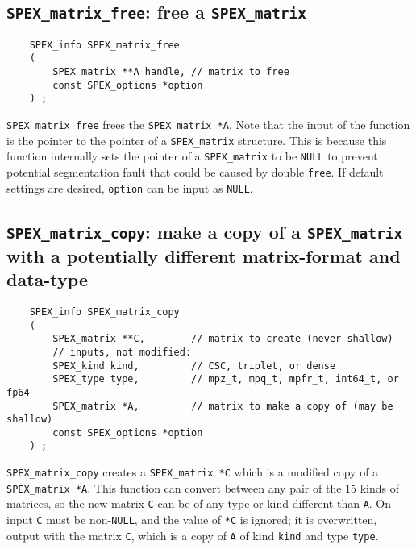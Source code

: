 \documentclass[12pt]{report}
\theoremstyle{definition}
\begin{document}
\cprotect\subsection{\verb|SPEX_matrix_free|: free a \verb|SPEX_matrix|}
\label{s:user:matrix_free}

\begin{mdframed}[userdefinedwidth=6in]
{\footnotesize
\begin{verbatim}
    SPEX_info SPEX_matrix_free
    (
        SPEX_matrix **A_handle, // matrix to free
        const SPEX_options *option
    ) ;
\end{verbatim}
} \end{mdframed}

\verb|SPEX_matrix_free| frees the \verb|SPEX_matrix *A|.  Note that the input
of the function is the pointer to the pointer of a \verb|SPEX_matrix|
structure. This is because this function internally sets the pointer of a
\verb|SPEX_matrix| to be \verb|NULL| to prevent potential segmentation fault
that could be caused by double \verb|free|.  If default settings are desired,
\verb|option| can be input as \verb|NULL|.

\cprotect\subsection{\verb|SPEX_matrix_copy|: make a copy of a \verb|SPEX_matrix| with a potentially different matrix-format and data-type}
\label{s:user:matrix_copy}

\begin{mdframed}[userdefinedwidth=6in]
{\footnotesize
\begin{verbatim}
    SPEX_info SPEX_matrix_copy
    (
        SPEX_matrix **C,        // matrix to create (never shallow)
        // inputs, not modified:
        SPEX_kind kind,         // CSC, triplet, or dense
        SPEX_type type,         // mpz_t, mpq_t, mpfr_t, int64_t, or fp64
        SPEX_matrix *A,         // matrix to make a copy of (may be shallow)
        const SPEX_options *option
    ) ;
\end{verbatim}
} \end{mdframed}

\verb|SPEX_matrix_copy| creates a \verb|SPEX_matrix *C| which is a modified
copy of a \verb|SPEX_matrix *A|. This function can convert between any pair of
the 15 kinds of matrices, so the new matrix \verb|C| can be of any type or kind
different than \verb|A|.  On input \verb|C| must be non-\verb|NULL|, and the
value of \verb|*C| is ignored; it is overwritten, output with the matrix
\verb|C|, which is a copy of \verb|A| of kind \verb|kind| and type \verb|type|.
\end{document}
